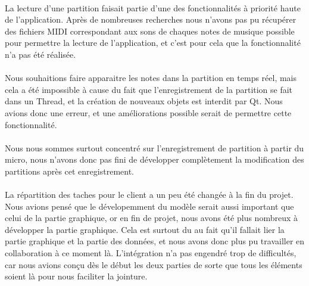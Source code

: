 \paragraph{}
La lecture d'une partition faisait partie d'une des fonctionnalités à priorité haute de l'application. Après 
de nombreuses recherches nous n'avons pas pu récupérer des fichiers MIDI correspondant aux sons de chaques 
notes de musique possible pour permettre la lecture de l'application, et c'est pour cela que la fonctionnalité 
n'a pas été réalisée.

\paragraph{}
Nous souhaitions faire apparaitre les notes dans la partition en temps réel, mais cela a été impossible à cause 
du fait que l'enregistrement de la partition se fait dans un Thread, et la création de nouveaux objets est 
interdit par Qt. Nous avions donc une erreur, et une améliorations possible serait de permettre cette fonctionnalité.

\paragraph{}
Nous nous sommes surtout concentré sur l'enregistrement de partition à partir du micro, nous n'avons donc pas fini 
de développer complètement la modification des partitions après cet enregistrement.

\paragraph{}
La répartition des taches pour le client a un peu été changée à la fin du projet. Nous avions pensé que le dévelopemment 
du modèle serait aussi important que celui de la partie graphique, or en fin de projet, nous avons été plus nombreux à 
développer la partie graphique. Cela est surtout du au fait qu'il fallait lier la partie graphique et la partie des données, 
et nous avons donc plus pu travailler en collaboration à ce moment là. L'intégration n'a pas engendré trop de difficultés, car 
nous avions conçu dès le début les deux parties de sorte que tous les éléments soient là pour nous faciliter la jointure.